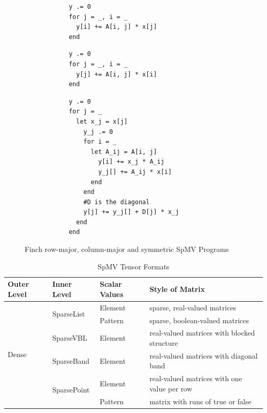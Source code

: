 \begin{figure}
    \begin{minipage}[t]{0.18\textwidth}
        \vspace{0pt} %
        \begin{verbatim}
            y .= 0
            for j = _, i = _
              y[i] += A[i, j] * x[j]
            end
        \end{verbatim}
        \vspace{24pt} %
        \begin{verbatim}
            y .= 0
            for j = _, i = _
              y[j] += A[i, j] * x[i]
            end
        \end{verbatim}
    \end{minipage}\hfill%
    \begin{minipage}[t]{0.22\textwidth}
        \vspace{0pt} %
        \begin{verbatim}
            y .= 0
            for j = _
              let x_j = x[j]
                y_j .= 0
                for i = _
                  let A_ij = A[i, j]
                    y[i] += x_j * A_ij
                    y_j[] += A_ij * x[i]
                  end
                end
                #D is the diagonal
                y[j] += y_j[] + D[j] * x_j
              end
            end
        \end{verbatim}
    \end{minipage}
    \caption{Finch row-major, column-major and symmetric SpMV Programs}
    \label{spmv_programs}
\end{figure}



\begin{table}[htbp]
    \scriptsize
    \centering
    \caption{SpMV Tensor Formats}
    \label{spmv_tensor_formats}
    \begin{tabular}{|l|l|l|l|}
        \hline
        \textbf{Outer Level} & \textbf{Inner Level} & \textbf{Scalar Values} & \textbf{Style of Matrix}\\
        \hline
        \multirow{6}{*}{Dense} & \multirow{2}{*}{SparseList} & Element & sparse, real-valued matrices \\
        \cline{3-4} 
        & & Pattern & sparse, boolean-valued matrices \\
        \cline{2-4} 
        & SparseVBL & Element & real-valued matrices with blocked structure \\
        \cline{2-4}
        & SparseBand & Element & real-valued matrices with diagonal band \\
        \cline{2-4}
        & \multirow{2}{*}{SparsePoint} & Element & real-valued matrices with one value per row \\
        \cline{3-4} 
        & & Pattern & matrix with runs of true or false \\
        \hline 
    \end{tabular}
\end{table}

